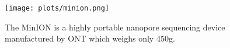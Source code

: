 \begin{figure}
\centering
\texttt{[image: plots/minion.png]}
\caption{\label{fig:minion}The MinION is a highly portable nanopore sequencing
device manufactured by ONT which weighs only 450g.}
\end{figure}
